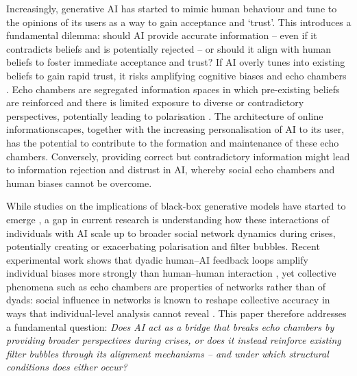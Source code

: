 \documentclass[pdflatex,sn-basic]{sn-jnl}
\begin{document}
Increasingly, generative AI has started to mimic human behaviour and tune to the opinions of its users \citep{sharma2024generative} as a way to gain acceptance and `trust'.
This introduces a fundamental dilemma: should AI provide accurate information -- even if it contradicts beliefs and is potentially rejected -- or should it align with human beliefs to foster immediate acceptance and trust? If AI overly tunes into existing beliefs to gain rapid trust, it risks amplifying cognitive biases and echo chambers \citep{ekstrom2022self}.
Echo chambers are segregated information spaces in which pre-existing beliefs are reinforced and there is limited exposure to diverse or contradictory perspectives, potentially leading to polarisation \citep{jeon2024hearhere}. The architecture of online informationscapes, together with the increasing personalisation of AI to its user, has the potential to contribute to the formation and maintenance of these echo chambers. Conversely, providing correct but contradictory information might lead to information rejection and distrust in AI, whereby social echo chambers and human biases cannot be overcome.

While studies on the implications of black-box generative models have started to emerge \citep{sharma2024generative,zhang2024see},
a gap in current research is understanding how these interactions of individuals with AI scale up to broader social network dynamics during crises, potentially creating or exacerbating polarisation and filter bubbles. Recent experimental work shows that dyadic human--AI feedback loops amplify individual biases more strongly than human--human interaction \citep{glickman2024human},
yet collective phenomena such as echo chambers are properties of networks rather than of dyads: social influence in networks is known to reshape collective accuracy in ways that individual-level analysis cannot reveal \citep{lorenz2011social,becker2017network}.
This paper therefore addresses a fundamental question: \emph{Does AI act as a bridge that breaks echo chambers by providing broader perspectives during crises, or does it instead reinforce existing filter bubbles through its alignment mechanisms -- and under which structural conditions does either occur?}
\end{document}
